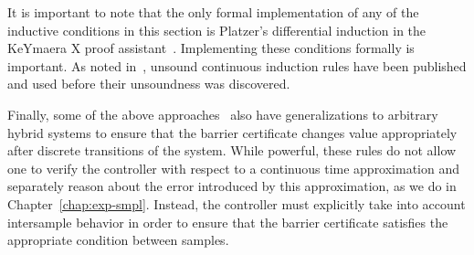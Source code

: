 It is important to note that the only formal implementation of any of the
inductive conditions in this section is Platzer's differential induction in
the KeYmaera X proof assistant~\cite{KeYmaeraX}. Implementing these
conditions formally is important. As noted in~\cite{taly2009deductive},
unsound continuous induction rules have been published and used before
their unsoundness was discovered.

Finally, some of the above
approaches~\cite{prajna04barrier,kong2013barrier} also have generalizations
to arbitrary hybrid systems to ensure that the barrier certificate changes
value appropriately after discrete transitions of the system. While
powerful, these rules do not allow one to verify the controller with
respect to a continuous time approximation and separately reason about the
error introduced by this approximation, as we do in
Chapter~\ref{chap:exp-smpl}. Instead, the controller must explicitly take
into account intersample behavior in order to ensure that the barrier
certificate satisfies the appropriate condition between samples.

